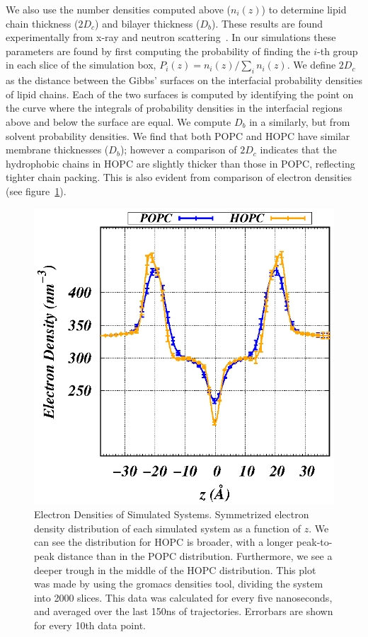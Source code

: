 \documentclass[12pt,openany,final]{book}
\begin{document}
We also use the number densities computed above ($n_i(z)$) to determine lipid chain 
thickness ($2D_c$) and bilayer thickness ($D_b$). These results are found experimentally from 
x-ray and neutron scattering~\cite{fogarty:2015}. In our simulations these parameters 
are found by first computing the probability of
finding the $i$-th group in each slice of the simulation box,
$P_i(z)={n_i(z)}/{\sum_i n_i(z)}$. We define $2D_c$ as the distance between the Gibbs' surfaces on the 
interfacial probability densities of lipid chains. Each of the two surfaces is computed by identifying the
point on the curve where 
the integrals of probability densities in the interfacial regions above and below the surface are equal. 
We compute $D_b$ in a similarly, but from solvent probability densities. 
We find that both POPC and HOPC have similar membrane thicknesses ($D_b$); however a comparison of $2D_c$ 
indicates that the hydrophobic chains in HOPC are slightly thicker than those in POPC, reflecting tighter chain packing. This 
is also evident from comparison of electron densities (see figure~\ref{fig:eledens}). 

\begin{figure}[p]
    \caption[Electron Densities of Simulated Systems.]{ 
Electron Densities of Simulated Systems. Symmetrized electron density distribution of each simulated system as a 
function of $z$. We can see the distribution for HOPC 
is broader, with a longer peak-to-peak distance than in the POPC distribution. Furthermore, 
we see a deeper trough in the middle of the HOPC distribution. This plot was made by using the gromacs densities tool, 
dividing the system into 2000 slices. This data was calculated for every five 
nanoseconds, and averaged over the last 150ns of trajectories. Errorbars are shown for every 10th data point.
}
\label{fig:eledens}
\includegraphics[height = 0.5\textheight]{ele_scattering_density.eps}
\end{figure}
\end{document}
